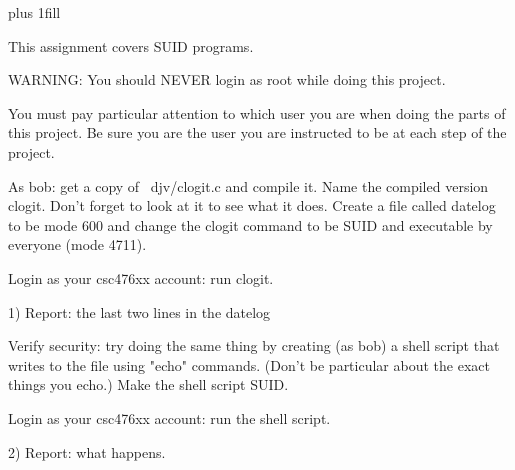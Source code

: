 
\rightskip=0pt plus 1fill

\parindent 0pt

This assignment covers SUID programs.

WARNING: You should NEVER login as root while doing this project.

You must pay particular attention to which user you are when
doing the parts of this project. Be sure you are the user
you are instructed to be at each step of the project.

As bob: get a copy of {\ltt{}~djv/clogit.c} and compile it.
Name the compiled version {\ltt{}clogit}.
Don't forget to look at it to see what it does.
Create a file called {\ltt{}datelog} to be mode 600 and
change the {\ltt{}clogit} command to be SUID and executable
by everyone (mode 4711).

Login as your csc476xx account: run clogit.

1) Report: the last two lines in the datelog

Verify security: try doing the same thing by creating (as bob) a shell
script that writes to the file using "echo" commands.
(Don't be particular about the exact things you echo.)
Make the shell script SUID.

Login as your csc476xx account: run the shell script.

2) Report: what happens.
\bye
